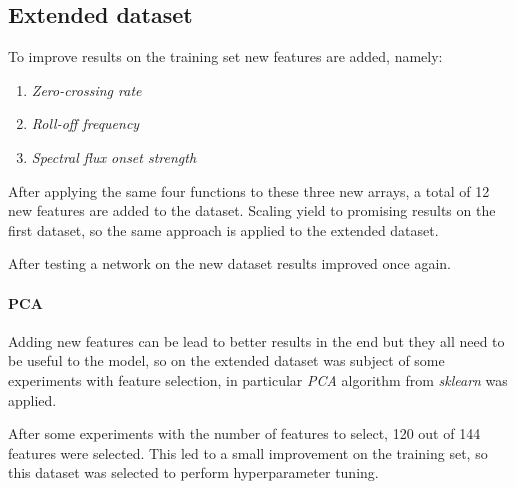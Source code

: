 \subsection{Extended dataset}
To improve results on the training set new features are added, namely: 
\begin{enumerate}
    \item \emph{Zero-crossing rate}
    \item \emph{Roll-off frequency}
    \item \emph{Spectral flux onset strength}
\end{enumerate}
After applying the same four functions to these three new arrays, 
a total of 12 new features are added to the dataset.
Scaling yield to promising results on the first dataset, 
so the same approach is applied to the extended dataset.

After testing a network on the new dataset results improved once again.

\paragraph{PCA}
Adding new features can be lead to better results 
in the end but they all need to be useful to the model, so on 
the extended dataset was subject of some experiments with feature selection, 
in particular \emph{PCA} algorithm from \emph{sklearn} was applied.

After some experiments with the number of features to select, 120 out of 144 
features were selected. This led to a small improvement on the training set, 
so this dataset was selected to perform hyperparameter tuning.